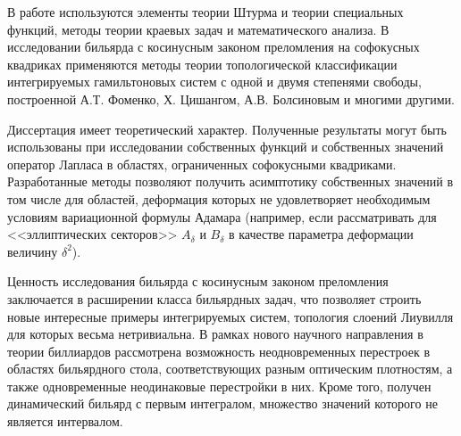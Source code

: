 
%
%
{\methods} В работе используются элементы теории Штурма и теории специальных функций, методы теории краевых задач и математического анализа. В исследовании бильярда с косинусным законом преломления на софокусных квадриках применяются методы теории топологической классификации интегрируемых
гамильтоновых систем с одной и двумя степенями свободы, построенной А.Т. Фоменко, Х. Цишангом, А.В. Болсиновым и многими другими.

{\influence} 
Диссертация имеет теоретический характер.
Полученные результаты могут быть использованы при исследовании собственных функций и собственных значений оператор Лапласа в областях, ограниченных софокусными квадриками.
Разработанные методы позволяют получить асимптотику собственных значений в том числе для областей, деформация которых не удовлетворяет необходимым условиям вариационной формулы Адамара (например, если рассматривать для <<эллиптических секторов>> $A_\delta$ и $B_\delta$ в качестве параметра деформации величину $\delta^2$).

Ценность исследования бильярда с косинусным законом преломления заключается в расширении класса бильярдных задач, что позволяет строить новые интересные примеры интегрируемых систем, топология слоений Лиувилля для которых весьма нетривиальна. 
В рамках нового научного направления в теории биллиардов рассмотрена возможность неодновременных перестроек в областях бильярдного стола, соответствующих разным оптическим плотностям, а также одновременные неодинаковые перестройки в них.
Кроме того, получен динамический бильярд с первым интегралом, множество значений которого не является интервалом.

